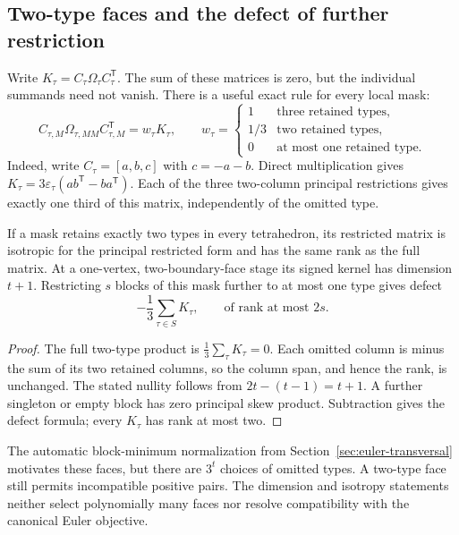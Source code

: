\subsection{Two-type faces and the defect of further restriction}

Write $K_\tau=C_\tau\Omega_\tau C_\tau^{\mathsf T}$.  The sum of these
matrices is zero, but the individual summands need not vanish.  There is a
useful exact rule for every local mask:
\[
 C_{\tau,M}\Omega_{\tau,M M}C_{\tau,M}^{\mathsf T}=w_\tau K_\tau,
 \qquad
 w_\tau=\begin{cases}
 1&\text{three retained types},\\
 1/3&\text{two retained types},\\
 0&\text{at most one retained type}.
 \end{cases}
\]
Indeed, write $C_\tau=[a,b,c]$ with $c=-a-b$.  Direct multiplication gives
$K_\tau=3\varepsilon_\tau(ab^{\mathsf T}-ba^{\mathsf T})$.
Each of the three two-column principal restrictions gives exactly one
third of this matrix, independently of the omitted type.

\begin{proposition}
If a mask retains exactly two types in every tetrahedron, its restricted
matrix is isotropic for the principal restricted form and has the same
rank as the full matrix.  At a one-vertex, two-boundary-face stage its
signed kernel has dimension $t+1$.  Restricting $s$ blocks of this mask
further to at most one type gives defect
\[
 -\frac13\sum_{\tau\in S}K_\tau,
 \qquad\text{of rank at most }2s.
\]
\end{proposition}
\begin{proof}
The full two-type product is $\frac13\sum_\tau K_\tau=0$.  Each omitted
column is minus the sum of its two retained columns, so the column span,
and hence the rank, is unchanged.  The stated nullity follows from
$2t-(t-1)=t+1$.  A further singleton or empty block has zero principal
skew product.  Subtraction gives the defect formula; every $K_\tau$ has
rank at most two.
\end{proof}

The automatic block-minimum normalization from
Section~\ref{sec:euler-transversal} motivates these faces, but there are
$3^t$ choices of omitted types.  A two-type face still permits incompatible
positive pairs.  The dimension and isotropy statements neither select
polynomially many faces nor resolve compatibility with the canonical Euler
objective.

